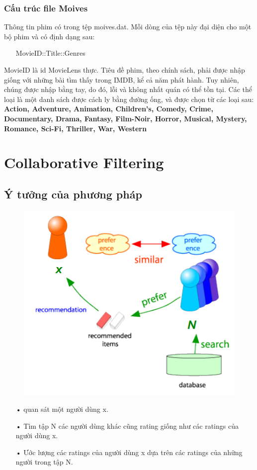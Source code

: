 \documentclass[a4paper,11pt]{report}
\begin{document}
\subsection{Cấu trúc file Moives}
Thông tin phim có trong tệp moives.dat. Mỗi dòng của tệp này đại diện cho một bộ phim và có định dạng sau:
\begin{itemize}
\item[] MovieID::Title::Genres
\end{itemize}
MovieID là id MovieLens thực. Tiêu đề phim, theo chính sách, phải được nhập giống với những bài tìm thấy trong IMDB, kể cả năm phát hành. Tuy nhiên, chúng được nhập bằng tay, do đó, lỗi và không nhất quán có thể tồn tại. Các thể loại là một danh sách được cách ly bằng đường ống, và được chọn từ các loại sau: \textbf{Action, Adventure, Animation, Children's, Comedy, Crime, Documentary, Drama, Fantasy, Film-Noir, Horror, Musical, Mystery, Romance, Sci-Fi, Thriller, War, Western}
\chapter{Collaborative Filtering}
\section{Ý tưởng của phương pháp}
\begin{figure}[h]
\begin{center}
\includegraphics[width =0.6 \textwidth]{CF.png}
\end{center}
\end{figure}
\begin{itemize}
\item[•] quan sát một người dùng x.
\item[•] Tìm tập N các người dùng khác cũng rating giống như các ratings của người dùng x.
\item[•] Ước lượng các ratings của người dùng x dựa trên các ratings của những người trong tập N.
\end{itemize}
\end{document}
